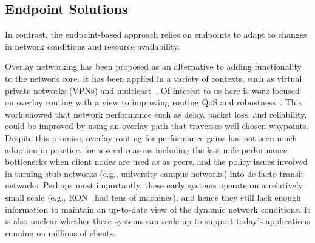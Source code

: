 \subsection{Endpoint Solutions}
In contrast, the endpoint-based approach relies on endpoints to adapt to changes
in network conditions and resource availability.

Overlay networking has been proposed as an alternative to adding functionality 
to the network core. It has been applied in a variety of contexts, such as 
virtual private networks (VPNs) and multicast~\cite{esm,ALMI-USITS01,
Multicast-Sigcomm02}. 
Of interest to us here is work focused on overlay routing with a view to improving 
routing QoS and robustness~\cite{Detour-Sigcomm99,RON-SOSP01}. 
This work showed that network performance such as 
delay, packet loss, and reliability, could be improved by using 
an overlay path that traverses well-chosen waypoints. 
Despite this promise,  overlay routing for performance gains has not seen 
much adoption in practice, for several reasons including the last-mile 
performance bottlenecks when client nodes are used as as peers, and 
the policy issues involved in turning stub networks (e.g., university campus 
networks) into de facto transit networks. 
Perhaps most importantly, these early systems operate on a relatively 
small scale (e.g., RON~\cite{RON-SOSP01} 
had tens of machines), and hence they still lack 
enough information to maintain an up-to-date view of the dynamic network 
conditions. It is also unclear whether these systems
can scale up to support today's applications running on millions of 
clients.




